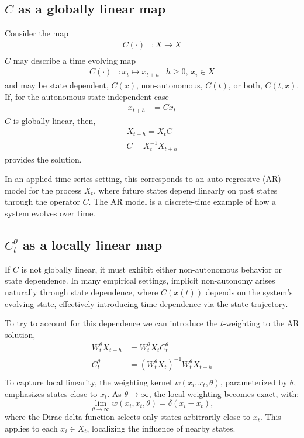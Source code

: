 \documentclass{article}
\begin{document}
\subsection{$C$ as a globally linear map}
Consider the map 
\begin{align*}
    C(\cdot)&: X \rightarrow X\\
\end{align*}
$C$ may describe a time evolving map
\begin{align*}
    C(\cdot)&: x_t \mapsto x_{t+h}    &h\geq0,\,x_i \in X
\end{align*}
and may be state dependent, $C(x)$, non-autonomous, $C(t)$, or both, $C(t, x)$. If, for the autonomous state-independent case
\begin{align*}
    x_{t+h} & = C x_t
\end{align*}
$C$ is globally linear, then,
\begin{align*}
    X_{t+h} = X_t C\\
    C = X_{t}^{-1} X_{t+h}
\end{align*}
provides the solution. 

In an applied time series setting, this corresponds to an auto-regressive (AR) model for the process \( X_t \), where future states depend linearly on past states through the operator \( C \). The AR model is a discrete-time example of how a system evolves over time.


\subsection{$C_t^\theta$ as a locally linear map}
If \( C \) is not globally linear, it must exhibit either non-autonomous behavior or state dependence. In many empirical settings, implicit non-autonomy arises naturally through state dependence, where \( C(x(t)) \) depends on the system's evolving state, effectively introducing time dependence via the state trajectory.

To try to account for this dependence we can introduce the $t$-weighting to the AR solution,
\begin{align*}
    W_t^\theta X_{t+h} & = W_t^\theta X_t C_t^\theta \\
    C_t^\theta & = (W_t^\theta X_t)^{-1} W_t^\theta X_{t+h} \\
\end{align*}
To capture local linearity, the weighting kernel \( w(x_i, x_t, \theta) \), parameterized by \( \theta \), emphasizes states close to \( x_t \). As \( \theta \to \infty \), the local weighting becomes exact, with:
$$
    \lim_{\theta\rightarrow\infty} w(x_i, x_t, \theta) = \delta(x_i - x_t),
$$
where the Dirac delta function selects only states arbitrarily close to \( x_t \). This applies to each \( x_i \in X_t \), localizing the influence of nearby states.
\end{document}
